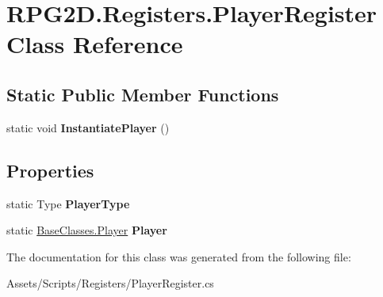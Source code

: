 \hypertarget{class_r_p_g2_d_1_1_registers_1_1_player_register}{}\section{R\+P\+G2\+D.\+Registers.\+Player\+Register Class Reference}
\label{class_r_p_g2_d_1_1_registers_1_1_player_register}
\subsection*{Static Public Member Functions}
\begin{DoxyCompactItemize}
\item 
\mbox{\label{class_r_p_g2_d_1_1_registers_1_1_player_register_a0e8f3e6604a4e6ebfa465155fa86b714}} 
static void {\bfseries Instantiate\+Player} ()
\end{DoxyCompactItemize}
\subsection*{Properties}
\begin{DoxyCompactItemize}
\item 
\mbox{\label{class_r_p_g2_d_1_1_registers_1_1_player_register_a502741198b14585bb8958f0b7e36724b}} 
static Type {\bfseries Player\+Type}
\item 
\mbox{\label{class_r_p_g2_d_1_1_registers_1_1_player_register_a08a8fcd89521906380d40e254361a1ac}} 
static \mbox{\hyperlink{class_r_p_g2_d_1_1_base_classes_1_1_player}{Base\+Classes.\+Player}} {\bfseries Player}
\end{DoxyCompactItemize}


The documentation for this class was generated from the following file\+:\begin{DoxyCompactItemize}
\item 
Assets/\+Scripts/\+Registers/Player\+Register.\+cs\end{DoxyCompactItemize}
